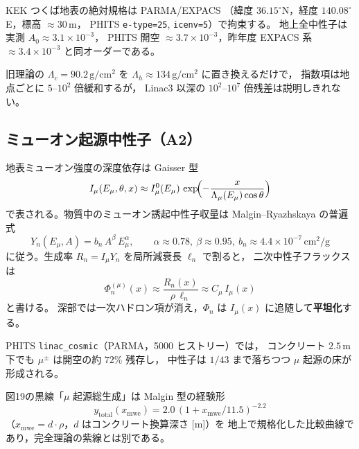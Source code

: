 \documentclass[a4paper,11pt]{ltjsarticle}
\begin{document}
KEK つくば地表の絶対規格は PARMA/EXPACS\cite{Sato2015,Sato2016}
（緯度 $36.15^\circ$N，経度 $140.08^\circ$E，標高 $\approx30$\,m，
PHITS \texttt{e-type=25}, \texttt{icenv=5}）で拘束する。
地上全中性子は実測 $A_0\approx3.1\times10^{-3}$，
PHITS 開空 $\approx3.7\times10^{-3}$，昨年度 EXPACS 系 $\approx3.4\times10^{-3}$
と同オーダーである\cite{S0,S6}。

旧理論の $\Lambda_c=90.2\,\mathrm{g/cm^2}$ を $\Lambda_h\approx134\,\mathrm{g/cm^2}$ に置き換えるだけで，
指数項は地点ごとに $5$--$10^{2}$ 倍緩和するが，
Linac3 以深の $10^{2}$--$10^{7}$ 倍残差は説明しきれない\cite{S1}。

\subsection{ミューオン起源中性子（A2）}

地表ミューオン強度の深度依存は Gaisser 型\cite{Gaisser2016}
\begin{equation}
  I_\mu(E_\mu,\theta,x)
  \approx I_\mu^0(E_\mu)\,
  \exp\!\Bigl(-\frac{x}{\Lambda_\mu(E_\mu)\cos\theta}\Bigr)
\end{equation}
で表される。物質中のミューオン誘起中性子収量は
Malgin--Ryazhskaya の普遍式\cite{Malgin2013,Malgin2016}
\begin{equation}
  Y_n(E_\mu,A)
  = b_n\, A^\beta\, E_\mu^\alpha,
  \qquad
  \alpha\approx0.78,\ 
  \beta\approx0.95,\ 
  b_n\approx4.4\times10^{-7}\,\mathrm{cm^2/g}
\end{equation}
に従う。生成率 $R_n=I_\mu Y_n$ を局所減衰長 $\ell_n$ で割ると，
二次中性子フラックスは
\begin{equation}
  \Phi_n^{(\mu)}(x)
  \approx \frac{R_n(x)}{\rho\,\ell_n}
  \approx C_\mu\, I_\mu(x)
  \label{eq:phi-mu}
\end{equation}
と書ける\cite{Wang2001,Heusser2006}。
深部では一次ハドロン項が消え，$\Phi_n$ は $I_\mu(x)$ に追随して\textbf{平坦化}する。

PHITS \texttt{linac\_cosmic}（PARMA，5000 ヒストリー）では，
コンクリート $2.5$\,m 下でも $\mu^\pm$ は開空の約 $72\%$ 残存し，
中性子は $1/43$ まで落ちつつ $\mu$ 起源の床が形成される\cite{S6}。

図19の黒線「$\mu$ 起源総生成」は Malgin 型の経験形
\begin{equation}
  y_{\mathrm{total}}(x_{\mathrm{mwe}})
  = 2.0\,(1+x_{\mathrm{mwe}}/11.5)^{-2.2}
\end{equation}
（$x_{\mathrm{mwe}}=d\cdot\rho$，$d$ はコンクリート換算深さ [m]）を
地上で規格化した比較曲線であり\cite{Malgin2013}，完全理論の紫線とは別である。
\end{document}
